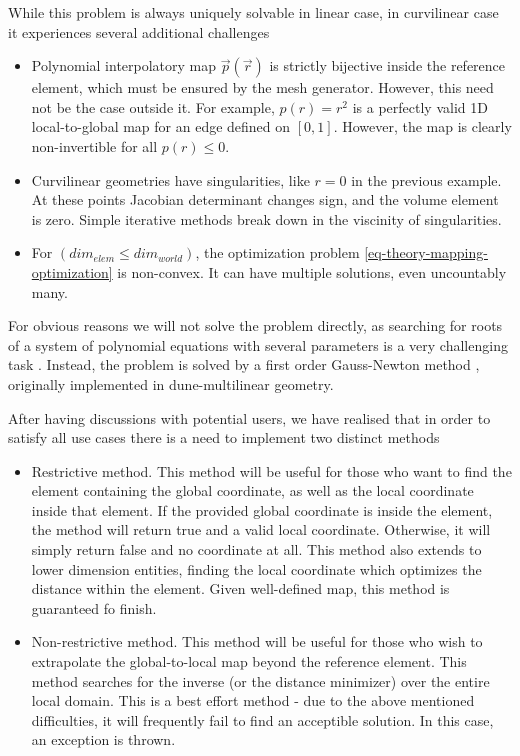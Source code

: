 \noindent
While this problem is always uniquely solvable in linear case, in curvilinear case it experiences several additional challenges
\begin{itemize}
	\item Polynomial interpolatory map $\vec{p}(\vec{r})$ is strictly bijective inside the reference element, which must be ensured by the mesh generator. However, this need not be the case outside it. For example, $p(r) = r^2$ is a perfectly valid 1D local-to-global map for an edge defined on $[0,1]$. However, the map is clearly non-invertible for all $p(r) \leq 0$.
	\item Curvilinear geometries have singularities, like $r = 0$ in the previous example. At these points Jacobian determinant changes sign, and the volume element is zero. Simple iterative methods break down in the viscinity of singularities. 
	\item For $(dim_{elem} \leq dim_{world})$, the optimization problem \ref{eq-theory-mapping-optimization} is non-convex. It can have multiple solutions, even uncountably many.
\end{itemize}

\noindent
For obvious reasons we will not solve the problem directly, as searching for roots of a system of polynomial equations with several parameters is a very challenging task \cite{canny+1989}. Instead, the problem is solved by a first order Gauss-Newton method \cite{bjoerck+1996}, originally implemented in dune-multilinear geometry.

\noindent
After having discussions with potential users, we have realised that in order to satisfy all use cases there is a need to implement two distinct methods
\begin{itemize}
  \item Restrictive method. This method will be useful for those who want to find the element containing the global coordinate, as well as the local coordinate inside that element. If the provided global coordinate is inside the element, the method will return true and a valid local coordinate. Otherwise, it will simply return false and no coordinate at all. This method also extends to lower dimension entities, finding the local coordinate which optimizes the distance within the element. Given well-defined map, this method is guaranteed fo finish.
  \item Non-restrictive method. This method will be useful for those who wish to extrapolate the global-to-local map beyond the reference element. This method searches for the inverse (or the distance minimizer) over the entire local domain. This is a best effort method - due to the above mentioned difficulties, it will frequently fail to find an acceptible solution. In this case, an exception is thrown.
\end{itemize}

